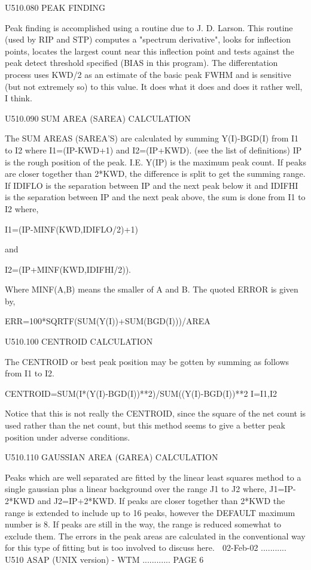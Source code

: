  
   U510.080  PEAK FINDING
 
   Peak finding is accomplished using a routine due  to  J.  D.  Larson.  This
   routine  (used  by RIP and STP) computes a "spectrum derivative", looks for
   inflection points, locates the largest count  near  this  inflection  point
   and  tests  against  the  peak  detect  threshold  specified  (BIAS in this
   program). The differentation process uses  KWD/2  as  an  estimate  of  the
   basic  peak  FWHM and is sensitive (but not extremely so) to this value. It
   does what it does and does it rather well, I think.
 
   U510.090  SUM AREA (SAREA) CALCULATION
 
   The SUM AREAS (SAREA'S) are calculated by summing Y(I)-BGD(I)  from  I1  to
   I2  where  I1=(IP-KWD+1)  and I2=(IP+KWD). (see the list of definitions) IP
   is the rough position of the peak. I.E. Y(IP) is the  maximum  peak  count.
   If  peaks  are  closer  together than 2*KWD, the difference is split to get
   the summing range. If IDIFLO is the separation  between  IP  and  the  next
   peak  below  it  and  IDIFHI is the separation between IP and the next peak
   above, the sum is done from I1 to I2 where,
 
   I1=(IP-MINF(KWD,IDIFLO/2)+1)
 
   and
 
   I2=(IP+MINF(KWD,IDIFHI/2)).
 
   Where MINF(A,B) means the smaller of A and B. The quoted ERROR is given by,
 
   ERR=100*SQRTF(SUM(Y(I))+SUM(BGD(I)))/AREA
 
   U510.100  CENTROID CALCULATION
 
   The CENTROID or best peak position may be  gotten  by  summing  as  follows
   from I1 to I2.
 
   CENTROID=SUM(I*(Y(I)-BGD(I))**2)/SUM((Y(I)-BGD(I))**2   I=I1,I2
 
   Notice  that  this  is not really the CENTROID, since the square of the net
   count is used rather than the net count, but this method seems  to  give  a
   better peak position under adverse conditions.
 
   U510.110  GAUSSIAN AREA (GAREA) CALCULATION
 
   Peaks  which  are  well  separated  are  fitted by the linear least squares
   method to a single gaussian plus a linear background over the range  J1  to
   J2  where,  J1=IP-2*KWD  and J2=IP+2*KWD. If peaks are closer together than
   2*KWD the range is extended to include up to 16 peaks, however the  DEFAULT
   maximum  number  is  8. If peaks are still in the way, the range is reduced
   somewhat to exclude them. The errors in the peak areas  are  calculated  in
   the  conventional  way  for  this  type  of  fitting but is too involved to
   discuss here.
    
   02-Feb-02 ........... U510  ASAP (UNIX version) - WTM ............ PAGE   6
 
